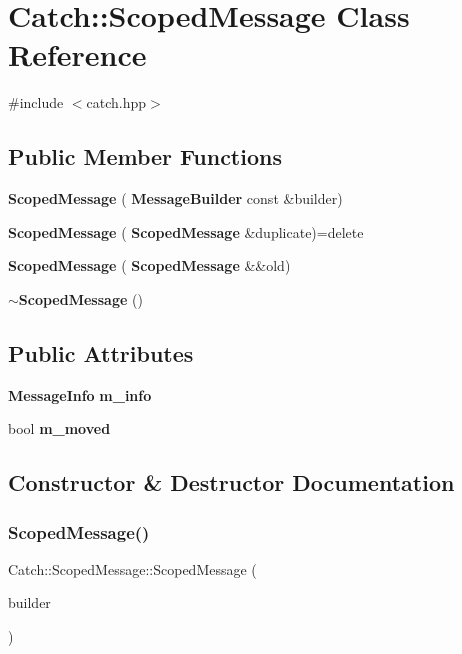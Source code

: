 \section{Catch\+::Scoped\+Message Class Reference}
\label{class_catch_1_1_scoped_message}


{\ttfamily \#include $<$catch.\+hpp$>$}

\subsection*{Public Member Functions}
\begin{DoxyCompactItemize}
\item 
\textbf{ Scoped\+Message} (\textbf{ Message\+Builder} const \&builder)
\item 
\textbf{ Scoped\+Message} (\textbf{ Scoped\+Message} \&duplicate)=delete
\item 
\textbf{ Scoped\+Message} (\textbf{ Scoped\+Message} \&\&old)
\item 
\textbf{ $\sim$\+Scoped\+Message} ()
\end{DoxyCompactItemize}
\subsection*{Public Attributes}
\begin{DoxyCompactItemize}
\item 
\textbf{ Message\+Info} \textbf{ m\+\_\+info}
\item 
bool \textbf{ m\+\_\+moved}
\end{DoxyCompactItemize}


\subsection{Constructor \& Destructor Documentation}
\mbox{\label{class_catch_1_1_scoped_message_a5cc59f0f2ebe840e6607f83004d49a17}} 
\subsubsection{ScopedMessage()\hspace{0.1cm}{\footnotesize\ttfamily [1/3]}}
{\footnotesize\ttfamily Catch\+::\+Scoped\+Message\+::\+Scoped\+Message (\begin{DoxyParamCaption}\item[{\textbf{ Message\+Builder} const \&}]{builder }\end{DoxyParamCaption})\hspace{0.3cm}{\ttfamily [explicit]}}

